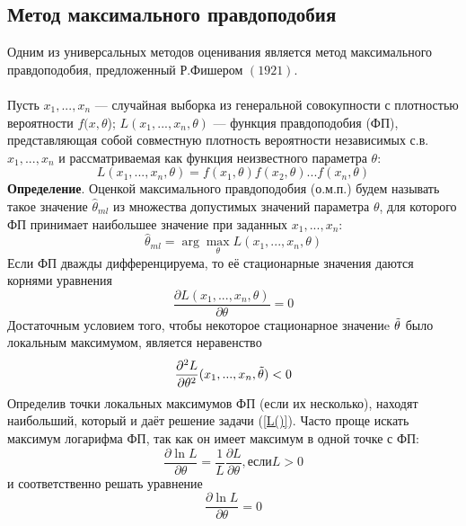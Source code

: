 \documentclass[../body.tex]{subfiles}
\begin{document}
	\subsection{Метод максимального правдоподобия}
	Одним из универсальных методов оценивания является метод максимального правдоподобия, предложенный Р.Фишером $(1921)$.\\ \\
	Пусть $x_{1},...,x_{n}$ — случайная выборка из генеральной совокупности с плотностью вероятности $f(x,\theta$); $L(x_{1},... ,x_{n}, \theta)$ — функция правдоподобия (ФП), представляющая собой совместную плотность вероятности независимых с.в. $x_{1}, ... ,x_{n}$ и рассматриваемая как функция неизвестного параметра $\theta$:
	\begin{equation}
		L(x_{1},...,x_{n},\theta) = f(x_{1},\theta)f(x_{2},\theta)...f(x_{n}, \theta)
		\label{L()}
	\end{equation}
	\textbf{Определение}. Оценкой максимального правдоподобия (о.м.п.) будем называть такое значение $\hat{\theta}_{ml}$ из множества допустимых значений параметра $\theta$, для которого ФП принимает наибольшее значение при заданных $x_{1},...,x_{n}$:
	\begin{equation}
		\hat{\theta}_{ml} = \arg \max_{\theta}L(x_{1},...,x_{n},\theta)
		\label{theta_mp}
	\end{equation}
	Если ФП дважды дифференцируема, то её стационарные значения даются корнями уравнения
	\begin{equation}
		\frac{\partial L(x_{1},...,x_{n},\theta)}{\partial \theta} = 0
		\label{eq_min}
	\end{equation}
	Достаточным условием того, чтобы некоторое стационарное значениe $\Tilde{\theta}$ было локальным максимумом, является неравенство
	\begin{equation}
		\frac{\partial^{2}L}{\partial \theta^{2}}(x_{1},...,x_{n},\Tilde{\theta}) < 0
		\label{ineq_min}
	\end{equation}
	Определив точки локальных максимумов ФП (если их несколько), находят наибольший, который и даёт решение задачи (\ref{L()}).
	Часто проще искать максимум логарифма ФП, так как он имеет максимум в одной точке с ФП:
	\begin{equation}
		\frac{\partial \ln L}{\partial \theta}=\frac{1}{L}\frac{\partial L}{\partial \theta}, если L > 0
		\label{log_max}
	\end{equation}
	и соответственно решать уравнение
	\begin{equation}
		\frac{\partial \ln L}{\partial \theta}= 0
		\label{log_m=0}
	\end{equation}
\end{document}
